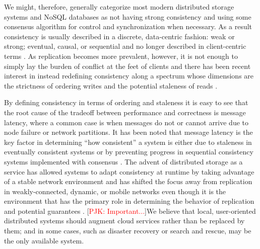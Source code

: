 \documentclass[10pt,conference,letterpaper]{IEEEtran}
\newcommand{\todo}[1]{{\textcolor{red}{#1}}}
\newcommand{\pjk}[1]{[\todo{PJK: #1}]}
\begin{document}
We might, therefore, generally categorize most modern distributed storage systems and NoSQL databases as not having strong consistency and using some consensus algorithm for control and synchronization when necessary. As a result consistency is usually described in a discrete, data-centric fashion: weak or strong; eventual, causal, or sequential and no longer described in client-centric terms \cite{bermbach_consistency_2013}. As replication becomes more prevalent, however, it is not enough to simply lay the burden of conflict at the feet of clients and there has been recent interest in instead redefining consistency along a spectrum whose dimensions are the strictness of ordering writes and the potential staleness of reads \cite{yu_design_2002,li_making_2012,afek_quasi-linearizability:_2010,al-ekram_multi-consistency_2010,krishnamurthy_adaptive_2002}.

By defining consistency in terms of ordering and staleness it is easy to see that the root cause of the tradeoff between performance and correctness is message latency, where a common case is when messages do not or cannot arrive due to node failure or network partitions. It has been noted that message latency is the key factor in determining ``how consistent'' a system is either due to staleness in eventually consistent systems \cite{bailis_probabilistically_2012} or by preventing progress in sequential consistency systems implemented with consensus \cite{howard_raft_2015}. The advent of distributed storage as a service has allowed systems to adapt consistency at runtime by taking advantage of a stable network environment \cite{chihoub_harmony:_2012,chihoub_consistency_2013,kraska_consistency_2009} and has shifted the focus away from replication in weakly-connected, dynamic, or mobile networks even though it is the environment that has the primary role in determining the behavior of replication and potential guarantees \cite{pitoura_data_1999,deno-toc}. \pjk{Important...}We believe that local, user-oriented distributed systems should augment cloud services rather than be replaced by them; and in some cases, such as disaster recovery or search and rescue, may be the only available system.
\end{document}
